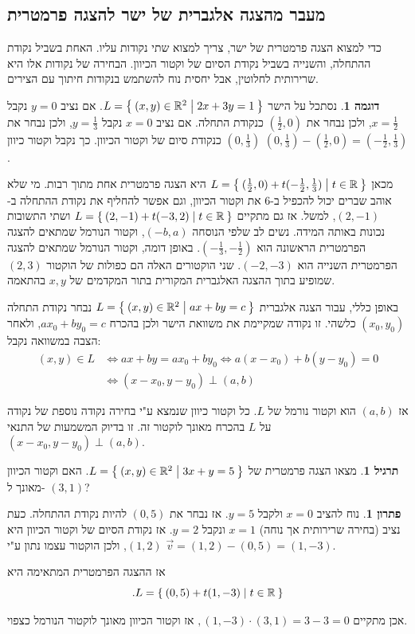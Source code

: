 \documentclass[12pt]{report}
\theoremstyle{plain}
\theoremstyle{definition}
\newtheorem{example}{דוגמה}[chapter]
\newtheorem{exercise}{תרגיל}[chapter]
\newtheorem*{solution}{פתרון}
\newcommand{\R}{\mathbb{R}}
\newcommand{\0}{\mathbf{0}}
\begin{document}
\subsection{מעבר מהצגה אלגברית של ישר להצגה פרמטרית}

כדי למצוא הצגה פרמטרית של ישר, צריך למצוא שתי נקודות עליו. האחת בשביל
נקודת ההתחלה, והשנייה בשביל נקודת הסיום של וקטור הכיוון. הבחירה של
נקודות אלו היא שרירותית לחלוטין, אבל יחסית נוח להשתמש בנקודות חיתוך
עם הצירים.

\begin{example}
נסתכל על הישר $L=\Set{(x,y)\in\R^2|2x+3y=1}$.
אם נציב $y=0$ נקבל $x=\frac{1}{2}$, ולכן נבחר את $(\frac{1}{2},0)$
כנקודת התחלה. אם נציב $x=0$ נקבל $y=\frac{1}{3}$, ולכן נבחר
את $(0,\frac{1}{3})$ כנקודת סיום של וקטור הכיוון. כך נקבל וקטור
כיוון $(0,\frac{1}{3})-(\frac{1}{2},0)=(-\frac{1}{2},\frac{1}{3})$.

מכאן $L=\Set{(\frac{1}{2},0)+t(-\frac{1}{2},\frac{1}{3})|t\in\R}$
היא הצגה פרמטרית אחת מתוך רבות. מי שלא אוהב שברים יכול להכפיל ב-$6$
את וקטור הכיוון, וגם אפשר להחליף את נקודת ההתחלה ב-$(2,-1)$,
למשל. אז גם מתקיים $L=\Set{(2,-1)+t(-3,2)|t\in\R}$ ושתי
התשובות נכונות באותה המידה. נשים לב שלפי הנוסחה $(-b,a)$, וקטור
הנורמל שמתאים להצגה הפרמטרית הראשונה הוא $(-\frac{1}{3},-\frac{1}{2})$.
באופן דומה, וקטור הנורמל שמתאים להצגה הפרמטרית השנייה הוא $(-2,-3)$.
שני הוקטורים האלה הם כפולות של הוקטור $(2,3)$ שמופיע בתוך ההצגה
האלגברית המקורית בתור המקדמים של $x,y$ בהתאמה.
\end{example}

באופן כללי, עבור הצגה אלגברית $L=\Set{(x,y)\in\R^2|ax+by=c}$
נבחר נקודת התחלה $(x_0,y_0)$ כלשהי. זו נקודה שמקיימת את משוואת
הישר ולכן בהכרח $ax_0+by_0=c$, ולאחר הצבה במשוואה נקבל:
\begin{align*}
	(x,y)\in L&\iff ax+by=ax_0+by_0\iff a(x-x_0)+b(y-y_0)=0 \\
    &\iff(x-x_0,y-y_0)\perp(a,b)
\end{align*}

אז $(a,b)$ הוא וקטור נורמל של $L$. כל וקטור כיוון שנמצא
ע"י בחירה נקודה נוספת של נקודה על $L$ בהכרח מאונך לוקטור
זה. זו בדיוק המשמעות של התנאי $(x-x_0,y-y_0)\perp(a,b)$.

\begin{exercise}
מצאו הצגה פרמטרית של $L=\Set{(x,y)\in\R^2|3x+y=5}$.
האם וקטור הכיוון מאונך ל-
$(3,1)$?
\end{exercise}

\begin{solution}
נוח להציב
$x=0$
ולקבל
$y=5$.
אז נבחר את
$(0,5)$
להיות נקודת ההתחלה. כעת נציב (בחירה שרירותית אך נוחה)
$x=1$
ונקבל
$y=2$.
אז נקודת הסיום של וקטור הכיוון היא
$(1,2)$,
ולכן הוקטור עצמו נתון ע"י
$\vec{v}=(1,2)-(0,5)=(1,-3)$.

אז ההצגה הפרמטרית המתאימה היא
$$
.L=\Set{(0,5)+t(1,-3)|t\in\R}
$$

אכן מתקיים
$,(1,-3)\cdot(3,1)=3-3=0$
אז וקטור הכיוון מאונך לוקטור הנורמל כצפוי.
\end{solution}
\end{document}
